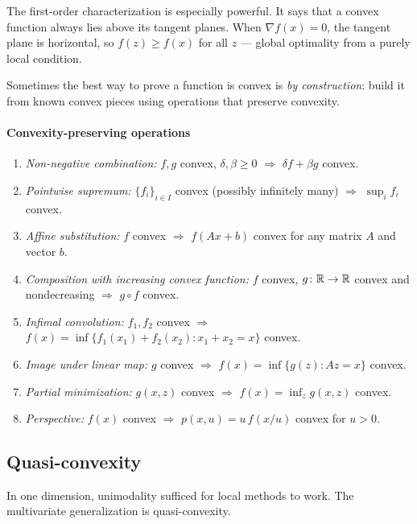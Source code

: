The first-order characterization is especially powerful.
It says that a convex function always lies above its tangent planes.
When $\nabla f(x) = 0$, the tangent plane is horizontal, so $f(z) \geq f(x)$ for all $z$ --- global optimality from a purely local condition.

Sometimes the best way to prove a function is convex is \textit{by construction}: build it from known convex pieces using operations that preserve convexity.

\paragraph{Convexity-preserving operations}

\begin{enumerate}
	\item \textit{Non-negative combination:} $f, g$ convex, $\delta, \beta \geq 0$ $\Rightarrow$ $\delta f + \beta g$ convex.
	\item \textit{Pointwise supremum:} $\{f_i\}_{i \in I}$ convex (possibly infinitely many) $\Rightarrow$ $\sup_i f_i$ convex.
	\item \textit{Affine substitution:} $f$ convex $\Rightarrow$ $f(Ax + b)$ convex for any matrix $A$ and vector $b$.
	\item \textit{Composition with increasing convex function:} $f$ convex, $g \colon \mathbb{R} \to \mathbb{R}$ convex and nondecreasing $\Rightarrow$ $g \circ f$ convex.
	\item \textit{Infimal convolution:} $f_1, f_2$ convex $\Rightarrow$ $f(x) = \inf\{f_1(x_1) + f_2(x_2) : x_1 + x_2 = x\}$ convex.
	\item \textit{Image under linear map:} $g$ convex $\Rightarrow$ $f(x) = \inf\{g(z) : Az = x\}$ convex.
	\item \textit{Partial minimization:} $g(x, z)$ convex $\Rightarrow$ $f(x) = \inf_z g(x, z)$ convex.
	\item \textit{Perspective:} $f(x)$ convex $\Rightarrow$ $p(x, u) = u\, f(x/u)$ convex for $u > 0$.
\end{enumerate}


\subsection{Quasi-convexity}\label{ssec:quasiconvex}

In one dimension, unimodality sufficed for local methods to work.
The multivariate generalization is quasi-convexity.

